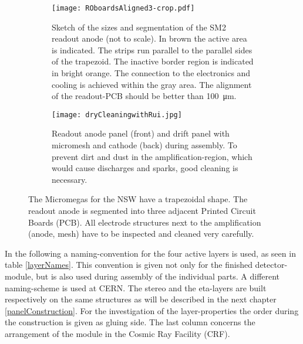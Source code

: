 \documentclass[
twoside,            %
BCOR1.4cm,          %
10pt,               %
headings=normal,    %
headsepline,        %
clearplainpage,		%
final,              %
div=14,
open=right,
bibliography=toc
]{scrreprt}
\begin{document}

\begin{figure}[!h]
	\begin{subfigure}[b]{0.48\textwidth}
		\centering
		\texttt{[image: ROboardsAligned3-crop.pdf]}
		\caption{
			Sketch of the sizes and segmentation of the SM2 readout anode (not to scale).
			In brown the active area is indicated.
			The strips run parallel to the parallel sides of the trapezoid.
			The inactive border region is indicated in bright orange.
			The connection to the electronics and cooling is achieved within the gray area.
			The alignment of the readout-PCB should be better than \SI{100}{\micro m}.
		}
		\label{layerSegmentation} 
	\end{subfigure}
	\hfill
	\begin{subfigure}[b]{0.48\textwidth}
		\centering
		\texttt{[image: dryCleaningwithRui.jpg]}
		\caption{
			Readout anode panel (front) and drift panel with micromesh and cathode (back) during assembly.
			To prevent dirt and dust in the amplification-region, which would cause discharges and sparks, good cleaning is necessary.
		}
		\label{assemplyAtRuis} 
	\end{subfigure}
	\vspace{-2mm}
	\caption{
		The Micromegas for the NSW have a trapezoidal shape.
		The readout anode is segmented into three adjacent Printed Circuit Boards (PCB).  
		All electrode structures next to the amplification (anode, mesh) have to be inspected and cleaned very carefully.
	}
\end{figure}

In the following a naming-convention for the four active layers is used, as seen in table \ref{layerNames}.
This convention is given not only for the finished detector-module, but is also used during assembly of the individual parts.
A different naming-scheme is used at CERN.
The stereo and the eta-layers are built respectively on the same structures as will be described in the next chapter \ref{panelConstruction}.
For the investigation of the layer-properties the order during the construction is given as gluing side.
The last column concerns the arrangement of the module in the Cosmic Ray Facility (CRF).
\end{document}
